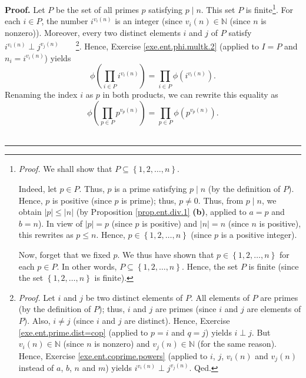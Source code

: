 \documentclass[numbers=enddot,12pt,final,onecolumn,notitlepage]{scrartcl}%
\numberwithin{exer}{subsection}
\theoremstyle{definition}
\newenvironment{proof}[1][Proof]{\noindent\textbf{#1.} }{\ \rule{0.5em}{0.5em}}
\let\prodnonlimits\prod
\renewcommand{\prod}{\prodnonlimits\limits}
\begin{document}
\begin{proof}
Let $P$ be the set of all primes $p$ satisfying $p\mid n$. This set $P$ is
finite\footnote{\textit{Proof.} We shall show that $P\subseteq\left\{
1,2,\ldots,n\right\}  $.
\par
Indeed, let $p\in P$. Thus, $p$ is a prime satisfying $p\mid n$ (by the
definition of $P$). Hence, $p$ is positive (since $p$ is prime); thus,
$p\neq0$. Thus, from $p\mid n$, we obtain $\left\vert p\right\vert
\leq\left\vert n\right\vert $ (by Proposition \ref{prop.ent.div.1}
\textbf{(b)}, applied to $a=p$ and $b=n$). In view of $\left\vert p\right\vert
=p$ (since $p$ is positive) and $\left\vert n\right\vert =n$ (since $n$ is
positive), this rewrites as $p\leq n$. Hence, $p\in\left\{  1,2,\ldots
,n\right\}  $ (since $p$ is a positive integer).
\par
Now, forget that we fixed $p$. We thus have shown that $p\in\left\{
1,2,\ldots,n\right\}  $ for each $p\in P$. In other words, $P\subseteq\left\{
1,2,\ldots,n\right\}  $. Hence, the set $P$ is finite (since the set $\left\{
1,2,\ldots,n\right\}  $ is finite).}. For each $i\in P$, the number
$i^{v_{i}\left(  n\right)  }$ is an integer (since $v_{i}\left(  n\right)
\in\mathbb{N}$ (since $n$ is nonzero)). Moreover, every two distinct elements
$i$ and $j$ of $P$ satisfy $i^{v_{i}\left(  n\right)  }\perp j^{v_{j}\left(
n\right)  }$\ \ \ \ \footnote{\textit{Proof.} Let $i$ and $j$ be two distinct
elements of $P$. All elements of $P$ are primes (by the definition of $P$);
thus, $i$ and $j$ are primes (since $i$ and $j$ are elements of $P$). Also,
$i\neq j$ (since $i$ and $j$ are distinct). Hence, Exercise
\ref{exe.ent.prime.dist=cop} (applied to $p=i$ and $q=j$) yields $i\perp j$.
But $v_{i}\left(  n\right)  \in\mathbb{N}$ (since $n$ is nonzero) and
$v_{j}\left(  n\right)  \in\mathbb{N}$ (for the same reason). Hence, Exercise
\ref{exe.ent.coprime.powers} (applied to $i$, $j$, $v_{i}\left(  n\right)  $
and $v_{j}\left(  n\right)  $ instead of $a$, $b$, $n$ and $m$) yields
$i^{v_{i}\left(  n\right)  }\perp j^{v_{j}\left(  n\right)  }$. Qed.}. Hence,
Exercise \ref{exe.ent.phi.multk.2} (applied to $I=P$ and $n_{i}=i^{v_{i}%
\left(  n\right)  }$) yields
\[
\phi\left(  \prod_{i\in P}i^{v_{i}\left(  n\right)  }\right)  =\prod_{i\in
P}\phi\left(  i^{v_{i}\left(  n\right)  }\right)  .
\]
Renaming the index $i$ as $p$ in both products, we can rewrite this equality
as
\begin{equation}
\phi\left(  \prod_{p\in P}p^{v_{p}\left(  n\right)  }\right)  =\prod_{p\in
P}\phi\left(  p^{v_{p}\left(  n\right)  }\right)  .
\label{pf.thm.ent.phi.explicit.4}%

\end{equation}
\end{proof}
\end{document}
